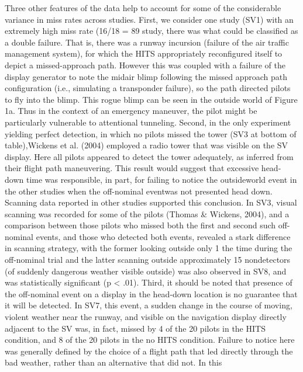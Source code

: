 \documentclass[utf8,bachelor,manualbib]{gradu3}
\begin{document}
Three other features of the data help to account for some of the considerable
variance in miss rates across studies. First, we consider one study (SV1) with an
extremely high miss rate (16/18 = 89%
study, there was what could be classified as a double failure. That is, there was a
runway incursion (failure of the air traffic management system), for which the
HITS appropriately reconfigured itself to depict a missed-approach path. However
this was coupled with a failure of the display generator to note the midair blimp
following the missed approach path configuration (i.e., simulating a transponder
failure), so the path directed pilots to fly into the blimp. This rogue blimp can be
seen in the outside world of Figure 1a. Thus in the context of an emergency maneuver,
the pilot might be particularly vulnerable to attentional tunneling.
Second, in the only experiment yielding perfect detection, in which no pilots
missed the tower (SV3 at bottom of table),Wickens et al. (2004) employed a radio
tower that was visible on the SV display. Here all pilots appeared to detect the
tower adequately, as inferred from their flight path maneuvering. This result would suggest that excessive head-down time was responsible, in part, for failing to notice
the outsideworld event in the other studies when the off-nominal eventwas not
presented head down. Scanning data reported in other studies supported this conclusion.
In SV3, visual scanning was recorded for some of the pilots (Thomas \&
Wickens, 2004), and a comparison between those pilots who missed both the first
and second such off-nominal events, and those who detected both events, revealed
a stark difference in scanning strategy, with the former looking outside only 1%
the time during the off-nominal trial and the latter scanning outside approximately
15%
nondetectors (of suddenly dangerous weather visible outside) was also observed in
SV8, and was statistically significant (p < .01).
Third, it should be noted that presence of the off-nominal event on a display in
the head-down location is no guarantee that it will be detected. In SV7, this event, a
sudden change in the course of moving, violent weather near the runway, and visible
on the navigation display directly adjacent to the SV was, in fact, missed by 4
of the 20 pilots in the HITS condition, and 8 of the 20 pilots in the no HITS condition.
Failure to notice here was generally defined by the choice of a flight path that
led directly through the bad weather, rather than an alternative that did not. In this
\end{document}
